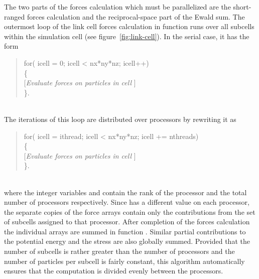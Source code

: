 \documentclass[a4paper,twoside]{report}
\newcommand{\Litf}{\ttfamily\upshape\mdseries}
\begin{document}
The two parts of the forces calculation which must be parallelized are
the short-ranged forces calculation and the reciprocal-space part of
the Ewald sum.  The outermost loop of the link cell forces calculation
in function  runs over all subcells within the
simulation cell (see figure~\ref{fig:link-cell}).  In the serial case, 
it has the form\\
\parbox{\textwidth}{%
\begin{quote}
  \Litf
  for( icell = 0; icell < nx*ny*nz; icell++)\\
  \{\\
  \hspace*{1cm}\textnormal{[\emph{Evaluate forces on particles in cell}
  ]}\\ 
    \}.
\end{quote}}\\
The iterations of this loop are distributed over processors by
rewriting it as\\
\parbox{\textwidth}{%
\begin{quote}
  \Litf
  for( icell = ithread; icell < nx*ny*nz; icell += nthreads)\\
  \{\\
  \hspace*{1cm}\textnormal{[\emph{Evaluate forces on particles in cell}
  ]}\\ 
    \}.
\end{quote}}\\
where the integer variables  and  contain
the rank of the processor and the total number of processors
respectively. Since  has a different value on each
processor, the separate copies of the force arrays contain only the
contributions from the set of subcells assigned to that processor.
After completion of the forces calculation the individual arrays are
summed in function .  Similar partial contributions to
the potential energy and the stress are also globally summed.
Provided that the number of subcells is rather greater than the number
of processors and the number of particles per subcell is fairly
constant, this algorithm automatically ensures that the computation is
divided evenly between the processors.
\end{document}
